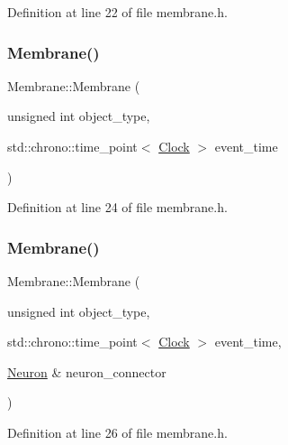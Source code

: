 Definition at line 22 of file membrane.\+h.

\mbox{\label{class_membrane_afeb8292866a69bdc2b9be6dcd902b519}} 
\subsubsection{\texorpdfstring{Membrane()}{Membrane()}\hspace{0.1cm}{\footnotesize\ttfamily [3/4]}}
{\footnotesize\ttfamily Membrane\+::\+Membrane (\begin{DoxyParamCaption}\item[{unsigned int}]{object\+\_\+type,  }\item[{std\+::chrono\+::time\+\_\+point$<$ \hyperlink{universe_8h_a0ef8d951d1ca5ab3cfaf7ab4c7a6fd80}{Clock} $>$}]{event\+\_\+time }\end{DoxyParamCaption})\hspace{0.3cm}{\ttfamily [inline]}}



Definition at line 24 of file membrane.\+h.

\mbox{\label{class_membrane_a8d61894d90a7f63e427cd8b1a5eca380}} 
\subsubsection{\texorpdfstring{Membrane()}{Membrane()}\hspace{0.1cm}{\footnotesize\ttfamily [4/4]}}
{\footnotesize\ttfamily Membrane\+::\+Membrane (\begin{DoxyParamCaption}\item[{unsigned int}]{object\+\_\+type,  }\item[{std\+::chrono\+::time\+\_\+point$<$ \hyperlink{universe_8h_a0ef8d951d1ca5ab3cfaf7ab4c7a6fd80}{Clock} $>$}]{event\+\_\+time,  }\item[{\hyperlink{class_neuron}{Neuron} \&}]{neuron\+\_\+connector }\end{DoxyParamCaption})\hspace{0.3cm}{\ttfamily [inline]}}



Definition at line 26 of file membrane.\+h.

